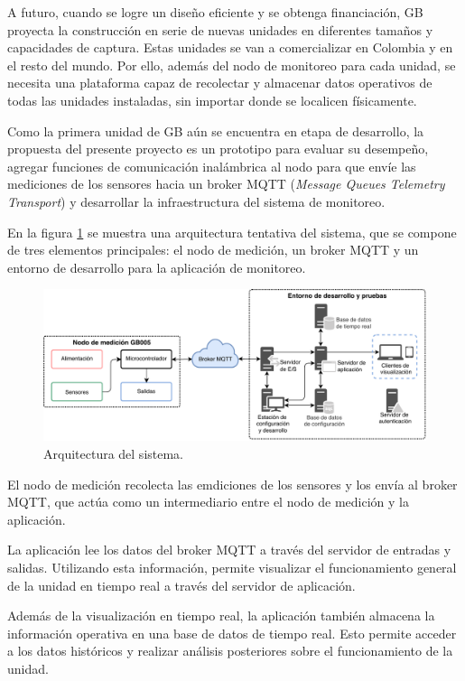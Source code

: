\documentclass[
11pt, %
]{charter}
\begin{document}
A futuro, cuando se logre un diseño eficiente y se obtenga financiación, GB proyecta la construcción en serie de nuevas unidades en diferentes tamaños y capacidades de captura. Estas unidades se van a comercializar en Colombia y en el resto del mundo. Por ello, además del nodo de monitoreo para cada unidad, se necesita una plataforma capaz de recolectar y almacenar datos operativos de todas las unidades instaladas, sin importar donde se localicen físicamente.

Como la primera unidad de GB aún se encuentra en etapa de desarrollo, la propuesta del presente proyecto es un prototipo para evaluar su desempeño, agregar funciones de comunicación inalámbrica al nodo para que envíe las mediciones de los sensores hacia un broker MQTT (\textit{Message Queues Telemetry Transport}) y desarrollar la infraestructura del sistema de monitoreo.

En la figura \ref{fig:diagBloques} se muestra una arquitectura tentativa del sistema, que se compone de tres elementos principales: el nodo de medición, un broker MQTT y un entorno de desarrollo para la aplicación de monitoreo.

\begin{figure}[htpb]
\centering 
\includegraphics[width=1\textwidth]{./Figuras/diagBloques.pdf}
\caption{Arquitectura del sistema.}
\label{fig:diagBloques}
\end{figure}

El nodo de medición recolecta las emdiciones de los sensores y los envía al broker MQTT, que actúa como un intermediario entre el nodo de medición y la aplicación.

La aplicación lee los datos del broker MQTT a través del servidor de entradas y salidas. Utilizando esta información, permite visualizar el funcionamiento general de la unidad en tiempo real a través del servidor de aplicación.

Además de la visualización en tiempo real, la aplicación también almacena la información operativa en una base de datos de tiempo real. Esto permite acceder a los datos históricos y realizar análisis posteriores sobre el funcionamiento de la unidad.
\end{document}
